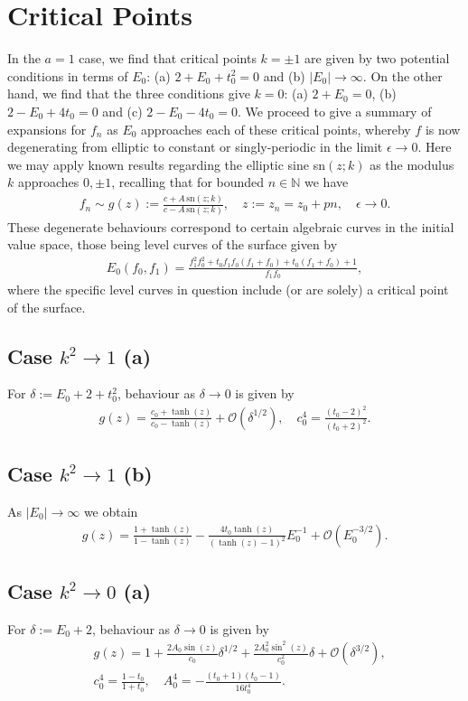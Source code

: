 \documentclass[reqno,a4paper]{amsart}
\numberwithin{equation}{section}
\theoremstyle{plain}
\theoremstyle{remark}
\begin{document}
\section{Critical Points}\label{sec:CritPoints} In the $a=1$ case, we find that critical points $k=\pm1$ are given by two potential conditions in terms of $E_0$: (a) $2+E_0+t_0^2=0$ and (b) $|E_0|\rightarrow\infty$. On the other hand, we find that the three conditions give $k=0$: (a) $2+E_0=0$, (b) $2-E_0+4t_0=0$ and (c) $2-E_0-4t_0=0$. We proceed to give a summary of expansions for $f_n$ as $E_0$ approaches each of these critical points, whereby $f$ is now degenerating from elliptic to constant or singly-periodic in the limit $\epsilon\to0$. Here we may apply known results regarding the elliptic sine sn$(z;k)$ as the modulus $k$ approaches $0,\pm1$, recalling that for bounded $n\in\mathbb{N}$ we have
\begin{align*}
    f_n\sim g(z):=\frac{c+A\,\text{sn}(z;k)}{c-A\,\text{sn}(z;k)},\quad z:=z_n=z_0+pn,\quad\epsilon\rightarrow0.
\end{align*}
These degenerate behaviours correspond to certain algebraic curves in the initial value space, those being level curves of the surface given by
\begin{align*}
    E_0(f_0,f_1)=\frac{f_{1}^2f_0^2+t_0f_{1}f_0(f_{1}+f_0)+t_0(f_{1}+f_{0})+1}{f_{1}f_0},
\end{align*}
where the specific level curves in question include (or are solely) a critical point of the surface.
\subsection{Case $k^2\to1$ (a)} For $\delta:=E_0+2+t_0^2$, behaviour as $\delta\to0$ is given by
\begin{align*}
    g(z)=\frac{c_0+\tanh(z)}{c_0-\tanh(z)}+\mathcal{O}\left(\delta^{1/2}\right),\quad c_0^4=\frac{(t_0-2)^2}{(t_0+2)^2}.
\end{align*}
\subsection{Case $k^2\to1$ (b)} As $|E_0|\to\infty$ we obtain
\begin{align*}
    g(z)=\frac{1+\tanh(z)}{1-\tanh(z)}-\frac{4t_0\tanh(z)}{(\tanh(z)-1)^2}E_0^{-1}+\mathcal{O}\left(E_0^{-3/2}\right).
\end{align*}
\subsection{Case $k^2\to0$ (a)}\label{subsec:rational1} For $\delta:=E_0+2$, behaviour as $\delta\to0$ is given by
\begin{align*}
    &g(z)=1+\frac{2A_0\sin(z)}{c_0}\delta^{1/2}+\frac{2A_0^2\sin^2(z)}{c_0^2}\delta+\mathcal{O}\left(\delta^{3/2}\right),\\
    &c_0^4=\frac{1-t_0}{1+t_0},\quad A_0^4=-\frac{(t_0+1)(t_0-1)}{16t_0^4}.
\end{align*}
\end{document}
